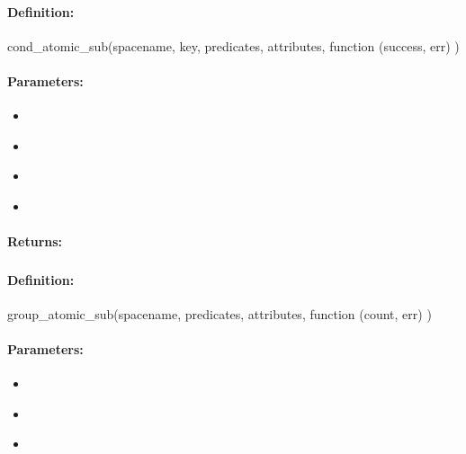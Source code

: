 \paragraph{Definition:}
\begin{javascriptcode}
cond_atomic_sub(spacename, key, predicates, attributes, function (success, err) {})
\end{javascriptcode}
\paragraph{Parameters:}
\begin{itemize}[noitemsep]
\item {}\\

\item {}\\

\item {}\\

\item {}\\

\end{itemize}

\paragraph{Returns:}


\pagebreak
\subsubsection{}
\label{api:nodejs:group_atomic_sub}


\paragraph{Definition:}
\begin{javascriptcode}
group_atomic_sub(spacename, predicates, attributes, function (count, err) {})
\end{javascriptcode}
\paragraph{Parameters:}
\begin{itemize}[noitemsep]
\item {}\\

\item {}\\

\item {}\\

\end{itemize}

